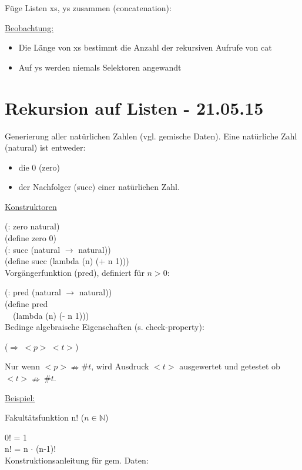\documentclass[a4paper, 20pt, openany]{book}
\begin{document}
Füge Listen xs, ys zusammen (concatenation):


\underline{Beobachtung:}

\begin{itemize}
  \item Die Länge von xs bestimmt die Anzahl der rekursiven Aufrufe von cat
  \item Auf ys werden niemals Selektoren angewandt
\end{itemize}

\chapter{Rekursion auf Listen - 21.05.15}

Generierung aller natürlichen Zahlen (vgl. gemische Daten). Eine natürliche Zahl (natural) ist entweder:

\begin{itemize}
  \item die 0 (zero)
  \item der Nachfolger (succ) einer natürlichen Zahl.
\end{itemize}

\underline{Konstruktoren}

(: zero natural) \\
(define zero 0) \\
(: succ (natural $\rightarrow$ natural)) \\
(define succ (lambda (n) (+ n 1))) \\

Vorgängerfunktion (pred), definiert für $n>0$:

(: pred (natural $\rightarrow$ natural)) \\
(define pred \\
\ \ (lambda (n) (- n 1))) \\

Bedinge algebraische Eigenschaften (s. check-property):

($\Rightarrow \ <p> \ <t>$)

Nur wenn $<p> \nRightarrow \#t$, wird Ausdruck $<t>$ ausgewertet und getestet ob $<t> \nRightarrow \ \#t$.

\underline{Beispiel:}

Fakultätsfunktion n! ($n \in \mathbb{N}$)

0! = 1 \\
n! = n $\cdot$ (n-1)! \\

Konstruktionsanleitung für gem. Daten:
\end{document}

